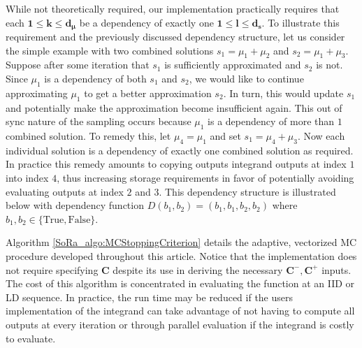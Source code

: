 \documentclass[graybox]{svmult}
\begin{document}
While not theoretically required, our implementation practically requires that each $\boldsymbol{1} \leq \boldsymbol{k} \leq \boldsymbol{d}_{\boldsymbol{\mu}}$ be a dependency of exactly one $\boldsymbol{1} \leq \boldsymbol{l} \leq \boldsymbol{d}_{\boldsymbol{s}}$. To illustrate this requirement and the previously discussed dependency structure, let us consider the simple example with two combined solutions $s_1 = \mu_1 + \mu_2$ and $s_2 = \mu_1 + \mu_3$. Suppose after some iteration that $s_1$ is sufficiently approximated and $s_2$ is not. Since $\mu_1$ is a dependency of both $s_1$ and $s_2$, we would like to continue approximating $\mu_1$ to get a better approximation $s_2$. In turn, this would update $s_1$ and potentially make the approximation become insufficient again. This out of sync nature of the sampling occurs because $\mu_1$ is a dependency of more than $1$ combined solution. To remedy this, let $\mu_4 = \mu_1$ and set $s_1 = \mu_4 + \mu_3$. Now each individual solution is a dependency of exactly one combined solution as required. In practice this remedy amounts to copying outputs integrand outputs at index $1$ into index $4$, thus increasing storage requirements in favor of potentially avoiding evaluating outputs at index $2$ and $3$. This dependency structure is illustrated below with dependency function $D(b_1,b_2) = (b_1,b_1,b_2,b_2)$ where $b_1,b_2 \in \{\text{True},\text{False}\}$. 

\begin{figure}
    \centering
{}
\end{figure}

Algorithm \ref{SoRa_algo:MCStoppingCriterion} details the adaptive, vectorized MC procedure developed throughout this article. Notice that the implementation does not require specifying $\boldsymbol{C}$ despite its use in deriving the necessary $\boldsymbol{C}^-,\boldsymbol{C}^+$ inputs. The cost of this algorithm is concentrated in evaluating the function at an IID or LD sequence. In practice, the run time may be reduced if the users implementation of the integrand can take advantage of not having to compute all outputs at every iteration or through parallel evaluation if the integrand is costly to evaluate.
\end{document}
